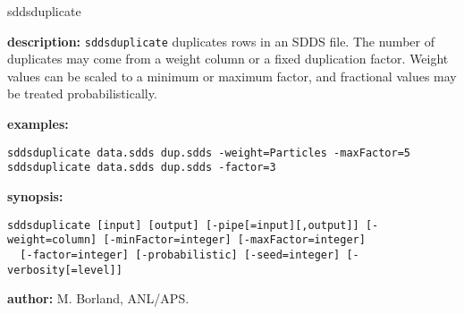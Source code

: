 \begin{sddsprog}{sddsduplicate}
  \item \textbf{description:}
  \verb|sddsduplicate| duplicates rows in an SDDS file. The number of duplicates may come from a weight column or a fixed duplication factor. Weight values can be scaled to a minimum or maximum factor, and fractional values may be treated probabilistically.
  \item \textbf{examples:}
    \begin{verbatim}
sddsduplicate data.sdds dup.sdds -weight=Particles -maxFactor=5
sddsduplicate data.sdds dup.sdds -factor=3
    \end{verbatim}
  \item \textbf{synopsis:}
    \begin{verbatim}
sddsduplicate [input] [output] [-pipe[=input][,output]] [-weight=column] [-minFactor=integer] [-maxFactor=integer]
  [-factor=integer] [-probabilistic] [-seed=integer] [-verbosity[=level]]
    \end{verbatim}
  \item \textbf{author:} M. Borland, ANL/APS.
\end{sddsprog}

